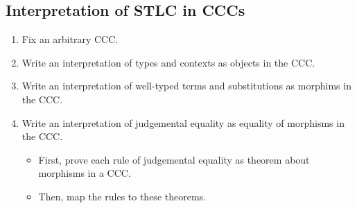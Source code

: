 \documentclass[a4paper]{scrartcl}
\begin{document}
\subsection{Interpretation of STLC in CCCs}
\begin{enumerate}
\item Fix an arbitrary CCC.
\item Write an interpretation of types and contexts as objects in the CCC.
\item Write an interpretation of well-typed terms and substitutions as
  morphims in the CCC.
\item Write an interpretation of judgemental equality as equality of
  morphisms in the CCC.
  \begin{itemize}
  \item First, prove each rule of judgemental equality as theorem
    about morphisms in a CCC.
  \item Then, map the rules to these theorems.
  \end{itemize}
\end{enumerate}
\end{document}

